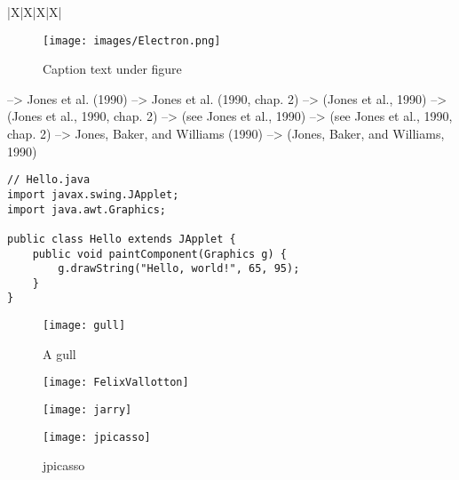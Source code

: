 \begin{table}[h]
\begin{tabu}{|X|X|X|X|}
\begin{figure}[!htb] %
\centering
\texttt{[image: images/Electron.png]}
\caption[Text for Table of Contents]{Caption text under figure}
\label{fig:Electron}
\end{figure}

\citet{jon90}	               -->    	Jones et al. (1990)
\citet[chap. 2]{jon90}	     -->    	Jones et al. (1990, chap. 2)
\citep{jon90}	               -->    	(Jones et al., 1990)
\citep[chap. 2]{jon90}	     -->    	(Jones et al., 1990, chap. 2)
\citep[see][]{jon90}	       -->    	(see Jones et al., 1990)
\citep[see][chap. 2]{jon90}	 -->    	(see Jones et al., 1990, chap. 2)
\citet*{jon90}	             -->    	Jones, Baker, and Williams (1990)
\citep*{jon90}	             -->    	(Jones, Baker, and Williams, 1990)




\begin{lstlisting}
// Hello.java
import javax.swing.JApplet;
import java.awt.Graphics;

public class Hello extends JApplet {
    public void paintComponent(Graphics g) {
        g.drawString("Hello, world!", 65, 95);
    }
}
\end{lstlisting}

\begin{wrapfigure}{r}{0.5\textwidth}
  \begin{center}
    \texttt{[image: gull]}
  \end{center}
  \caption{A gull}
\end{wrapfigure}

\begin{figure}
\centering
\begin{minipage}{.275\linewidth}
  \texttt{[image: FelixVallotton]}
  \caption[figure1]{FelixVallotton}
  \label{img1}
\end{minipage}
\hspace{.05\linewidth}
\begin{minipage}{.275\linewidth}
  \texttt{[image: jarry]}
  \caption[figure2]{jarry}
  \label{img2}
\end{minipage}
\hspace{.05\linewidth}
\begin{minipage}{.275\linewidth}
  \texttt{[image: jpicasso]}
  \caption[figure3]{jpicasso}
  \label{img3}
\end{minipage}
\end{figure}



\end{tabu}
\end{table}
